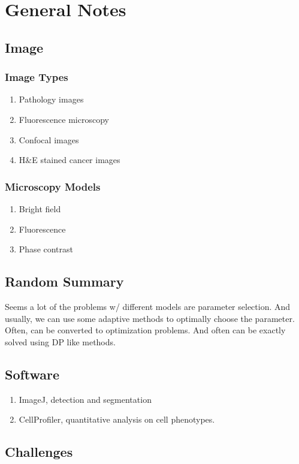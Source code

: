 \documentclass[10pt,a4paper]{article}
\begin{document}
\section{General Notes}
\subsection{Image}
\subsubsection{Image Types}
\begin{enumerate}
	\item Pathology images
	\item Fluorescence microscopy
	\item Confocal images
	\item H\&E stained cancer images
\end{enumerate}
\subsubsection{Microscopy Models}
\begin{enumerate}
	\item Bright field
	\item Fluorescence
	\item Phase contrast
\end{enumerate}

\subsection{Random Summary}
Seems a lot of the problems w/ different models are parameter selection. And usually, we can use some adaptive methods to optimally choose the parameter.\\
Often, can be converted to optimization problems. And often can be exactly solved using DP like methods.

\subsection{Software}
\begin{enumerate}
	\item ImageJ, detection and segmentation
	\item CellProfiler, quantitative analysis on cell phenotypes.
\end{enumerate}

\subsection{Challenges}
\end{document}
